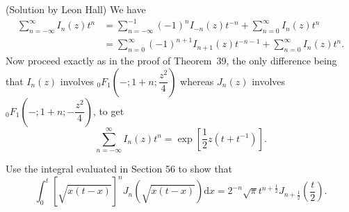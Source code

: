 \begin{solution}(Solution by Leon Hall)
We have
$$\begin{array}{ll}
\displaystyle\sum_{n=-\infty}^{\infty} I_n(z) t^n &= \displaystyle\sum_{n=-\infty}^{-1} (-1)^n I_{-n}(z) t^{-n} + \displaystyle\sum_{n=0}^{\infty} I_n(z) t^n \\
&= \displaystyle\sum_{n=0}^{\infty} (-1)^{n+1} I_{n+1}(z) t^{-n-1} + \displaystyle\sum_{n=0}^{\infty} I_n(z) t^n.
\end{array}$$
Now proceed exactly as in the proof of Theorem~39, the only difference being that $I_n(z)$ involves ${}_0F_1 \left( -; 1+n; \dfrac{z^2}{4} \right)$ whereas $J_n(z)$ involves ${}_0F_1 \left( -;1+n; -\dfrac{z^2}{4} \right)$, to get
$$\displaystyle\sum_{n=-\infty}^{\infty} I_n(z) t^n = \exp \left[ \dfrac{1}{2} z (t+t^{-1}) \right].$$
\end{solution}
\begin{problem} \label{problem18chapter6}
Use the integral evaluated in Section 56 to show that
$$\displaystyle\int_0^t [\sqrt{x(t-x)}]^n J_n(\sqrt{x(t-x)}) \mathrm{d}x = 2^{-n} \sqrt{\pi} t^{n+\frac{1}{2}} J_{n + \frac{1}{2}} \left( \dfrac{t}{2} \right).$$
\end{problem}
